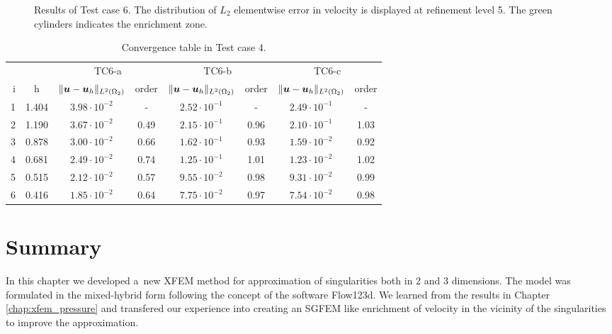 %
\begin{figure}[!htb]
    \centering
    \caption
    {Results of Test case 6. The distribution of $L_2$ elementwise error in velocity is displayed at refinement level 5.
    The green cylinders indicates the enrichment zone. }
    \label{fig:mh_tc4_error}
\end{figure}
%


\begin{table}[!htb]
\begin{center}
\bgroup
\def\arraystretch{1.2}
\setlength\tabcolsep{5pt}
\begin{tabular}{rc|cc|cc|cc}
\toprule
\multicolumn{2}{c|}{} & \multicolumn{2}{c|}{ TC6-a } & \multicolumn{2}{c|}{ TC6-b } & \multicolumn{2}{c}{TC6-c}\\ [3pt] %
i & h & $\|\mathbf{\boldsymbol{u}}-\mathbf{\boldsymbol{u}}_h\|_{L^2(\Omega_2)}$ & order & $\|\mathbf{\boldsymbol{u}}-\mathbf{\boldsymbol{u}}_h\|_{L^2(\Omega_2)}$
    & order & $\|\mathbf{\boldsymbol{u}}-\mathbf{\boldsymbol{u}}_h\|_{L^2(\Omega_2)}$ & order \\ [3pt] \midrule
1 & 1.404 &  $3.98\cdot10^{-2}$  &  -   &  $2.52\cdot10^{-1}$  &  -   &  $2.49\cdot10^{-1}$ &   -   \\
2 & 1.190 &  $3.67\cdot10^{-2}$  & 0.49 &  $2.15\cdot10^{-1}$  & 0.96 &  $2.10\cdot10^{-1}$ &  1.03 \\
3 & 0.878 &  $3.00\cdot10^{-2}$  & 0.66 &  $1.62\cdot10^{-1}$  & 0.93 &  $1.59\cdot10^{-2}$ &  0.92 \\
4 & 0.681 &  $2.49\cdot10^{-2}$  & 0.74 &  $1.25\cdot10^{-1}$  & 1.01 &  $1.23\cdot10^{-2}$ &  1.02 \\
5 & 0.515 &  $2.12\cdot10^{-2}$  & 0.57 &  $9.55\cdot10^{-2}$  & 0.98 &  $9.31\cdot10^{-2}$ &  0.99 \\
6 & 0.416 &  $1.85\cdot10^{-2}$  & 0.64 &  $7.75\cdot10^{-2}$  & 0.97 &  $7.54\cdot10^{-2}$ &  0.98 \\
\bottomrule
\end{tabular}
\caption{Convergence table in Test case 4.}
\label{tab:mh_tc6_convergence}
\egroup
\end{center}
\end{table}


\section{Summary}
In this chapter we developed a~new XFEM method for approximation of singularities both in 2 and 3 dimensions.
The model was formulated in the mixed-hybrid form following the concept of the software Flow123d.
We learned from the results in Chapter \ref{chap:xfem_pressure} and transfered our experience into creating
an SGFEM like enrichment of velocity in the vicinity of the singularities to improve the approximation.

